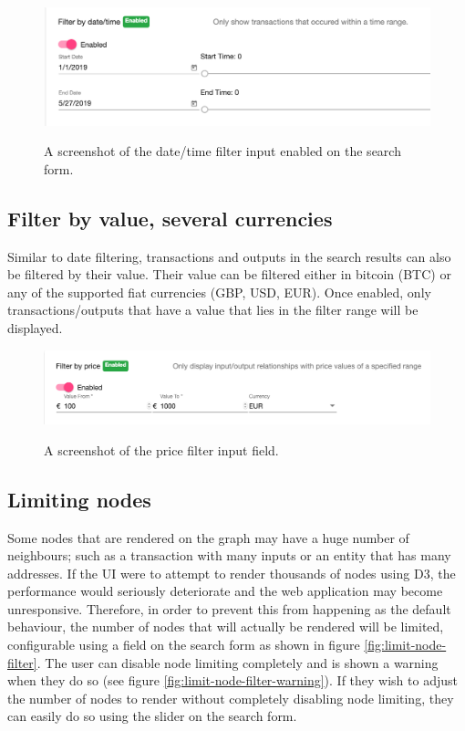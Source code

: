 \begin{figure}[h!]
  \centering
  \includegraphics[width = 15cm]{./figures/ui-screenshots/date-time-filter}\\[0.5cm] 
  \caption{A screenshot of the date/time filter input enabled on the search form.}
  \label{fig:date-time-filter}
\end{figure}

\subsection{Filter by value, several currencies}
Similar to date filtering, transactions and outputs in the search results can also be filtered by their value. Their value can be filtered either in bitcoin (BTC) or any of the supported fiat currencies (GBP, USD, EUR). Once enabled, only transactions/outputs that have a value that lies in the filter range will be displayed. 

\begin{figure}[h!]
  \centering
  \includegraphics[width = 15cm]{./figures/ui-screenshots/price-filter-form}\\[0.5cm] 
  \caption{A screenshot of the price filter input field.}
  \label{fig:date-time-filter}
\end{figure}

\subsection{Limiting nodes}\label{feature-limit-nodes}
Some nodes that are rendered on the graph may have a huge number of neighbours; such as a transaction with many inputs or an entity that has many addresses. If the UI were to attempt to render thousands of nodes using D3, the performance would seriously deteriorate and the web application may become unresponsive. Therefore, in order to prevent this from happening as the default behaviour, the number of nodes that will actually be rendered will be limited, configurable using a field on the search form as shown in figure \ref{fig:limit-node-filter}. The user can disable node limiting completely and is shown a warning when they do so (see figure \ref{fig:limit-node-filter-warning}). If they wish to adjust the number of nodes to render without completely disabling node limiting, they can easily do so using the slider on the search form. 

